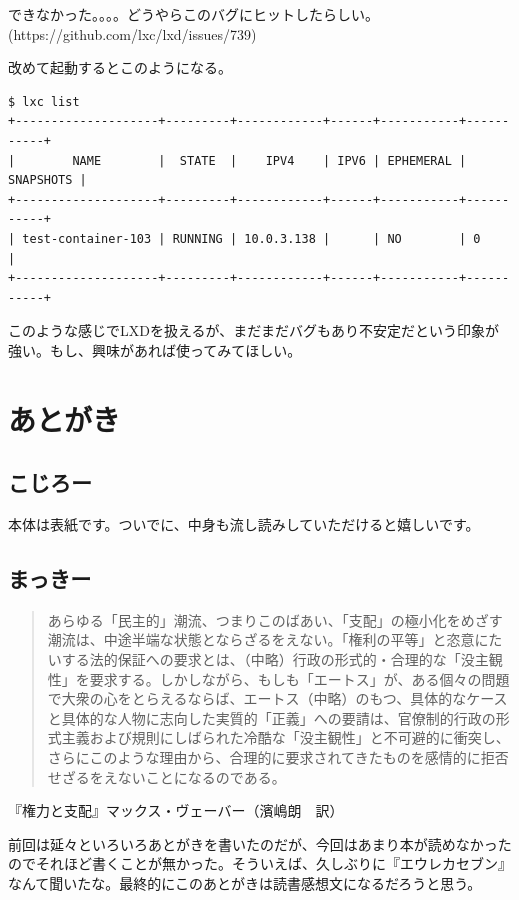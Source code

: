 ﻿\documentclass[9pt,b5paper,tombo,openany]{jsbook}
\begin{document}
\noindent
できなかった。。。。どうやらこのバグにヒットしたらしい。(https://github.com/lxc/lxd/issues/739)

\noindent
改めて起動するとこのようになる。
\begin{lstlisting}
$ lxc list
+--------------------+---------+------------+------+-----------+-----------+
|        NAME        |  STATE  |    IPV4    | IPV6 | EPHEMERAL | SNAPSHOTS |
+--------------------+---------+------------+------+-----------+-----------+
| test-container-103 | RUNNING | 10.0.3.138 |      | NO        | 0         |
+--------------------+---------+------------+------+-----------+-----------+
\end{lstlisting}

\noindent
このような感じでLXDを扱えるが、まだまだバグもあり不安定だという印象が強い。もし、興味があれば使ってみてほしい。

\chapter{あとがき}

\section*{こじろー}
本体は表紙です。ついでに、中身も流し読みしていただけると嬉しいです。

\section*{まっきー}

\begin{quote}
	あらゆる「民主的」潮流、つまりこのばあい、「支配」の極小化をめざす潮流は、中途半端な状態とならざるをえない。「権利の平等」と恣意にたいする法的保証への要求とは、（中略）行政の形式的・合理的な「没主観性」を要求する。しかしながら、もしも「エートス」が、ある個々の問題で大衆の心をとらえるならば、エートス（中略）のもつ、具体的なケースと具体的な人物に志向した実質的「正義」への要請は、官僚制的行政の形式主義および規則にしばられた冷酷な「没主観性」と不可避的に衝突し、さらにこのような理由から、合理的に要求されてきたものを感情的に拒否せざるをえないことになるのである。
\end{quote}

\begin{flushright}
	『権力と支配』マックス・ヴェーバー（濱嶋朗　訳）
\end{flushright}

前回は延々といろいろあとがきを書いたのだが、今回はあまり本が読めなかったのでそれほど書くことが無かった。そういえば、久しぶりに『エウレカセブン』なんて聞いたな。最終的にこのあとがきは読書感想文になるだろうと思う。
\end{document}
